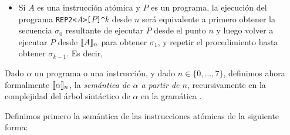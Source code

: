 \begin{itemize}
      
      
      
      



\item Si $A$ es una instrucción atómica y $P$ es un programa, la ejecución del programa 
\verb#REP2<#$A$\verb#>[#$P$\verb#]^#$k$ desde $n$ será equivalente a primero obtener la secuencia $\sigma_0$ resultante de ejecutar $P$ desde el punto $n$ y luego volver a ejecutar $P$ desde $\llbracket A\rrbracket_n$ para obtener $\sigma_1$, y repetir el procedimiento hasta obtener $\sigma_{k-1}$. Es decir,

\begin{center}
\begin{algorithm}
\end{algorithm}
\end{center}



      
      



\end{itemize}

Dado $\alpha$ un programa o una instrucción, y dado $n\in\{0,\dots,7\}$, definimos ahora formalmente $\llbracket \alpha\rrbracket_n$, la {\em semántica de $\alpha$ a partir de $n$}, recursivamente en la complejidad del árbol sintáctico de $\alpha$ en la gramática \gramgeo.

Definimos primero la semántica de las instrucciones atómicas de la siguiente forma:

